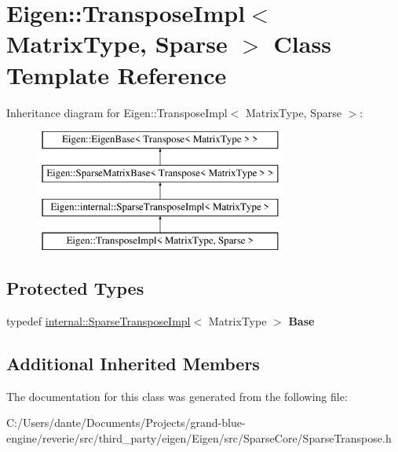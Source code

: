 \hypertarget{class_eigen_1_1_transpose_impl_3_01_matrix_type_00_01_sparse_01_4}{}\section{Eigen\+::Transpose\+Impl$<$ Matrix\+Type, Sparse $>$ Class Template Reference}
\label{class_eigen_1_1_transpose_impl_3_01_matrix_type_00_01_sparse_01_4}
Inheritance diagram for Eigen\+::Transpose\+Impl$<$ Matrix\+Type, Sparse $>$\+:\begin{figure}[H]
\begin{center}
\leavevmode
\includegraphics[height=4.000000cm]{class_eigen_1_1_transpose_impl_3_01_matrix_type_00_01_sparse_01_4}
\end{center}
\end{figure}
\subsection*{Protected Types}
\begin{DoxyCompactItemize}
\item 
\mbox{\label{class_eigen_1_1_transpose_impl_3_01_matrix_type_00_01_sparse_01_4_a76758b6e667130ceae02fe388051d4f8}} 
typedef \mbox{\hyperlink{class_eigen_1_1internal_1_1_sparse_transpose_impl}{internal\+::\+Sparse\+Transpose\+Impl}}$<$ Matrix\+Type $>$ {\bfseries Base}
\end{DoxyCompactItemize}
\subsection*{Additional Inherited Members}


The documentation for this class was generated from the following file\+:\begin{DoxyCompactItemize}
\item 
C\+:/\+Users/dante/\+Documents/\+Projects/grand-\/blue-\/engine/reverie/src/third\+\_\+party/eigen/\+Eigen/src/\+Sparse\+Core/Sparse\+Transpose.\+h\end{DoxyCompactItemize}
